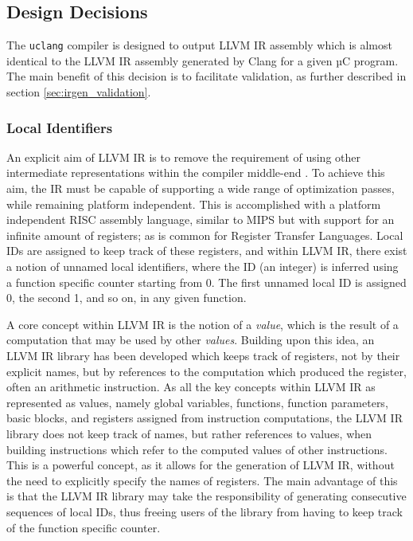 \subsection{Design Decisions}

The \texttt{uclang} compiler is designed to output LLVM IR assembly which is almost identical to the LLVM IR assembly generated by Clang for a given µC program. The main benefit of this decision is to facilitate validation, as further described in section \ref{sec:irgen_validation}.

\subsubsection{Local Identifiers}

An explicit aim of LLVM IR is to remove the requirement of using other intermediate representations within the compiler middle-end \cite{osa_llvm}. To achieve this aim, the IR must be capable of supporting a wide range of optimization passes, while remaining platform independent. This is accomplished with a platform independent RISC assembly language, similar to MIPS but with support for an infinite amount of registers; as is common for Register Transfer Languages. Local IDs are assigned to keep track of these registers, and within LLVM IR, there exist a notion of unnamed local identifiers, where the ID (an integer) is inferred using a function specific counter starting from 0. The first unnamed local ID is assigned 0, the second 1, and so on, in any given function.

A core concept within LLVM IR is the notion of a \textit{value}, which is the result of a computation that may be used by other \textit{values}. Building upon this idea, an LLVM IR library has been developed which keeps track of registers, not by their explicit names, but by references to the computation which produced the register, often an arithmetic instruction. As all the key concepts within LLVM IR as represented as values, namely global variables, functions, function parameters, basic blocks, and registers assigned from instruction computations, the LLVM IR library does not keep track of names, but rather references to values, when building instructions which refer to the computed values of other instructions. This is a powerful concept, as it allows for the generation of LLVM IR, without the need to explicitly specify the names of registers. The main advantage of this is that the LLVM IR library may take the responsibility of generating consecutive sequences of local IDs, thus freeing users of the library from having to keep track of the function specific counter.


